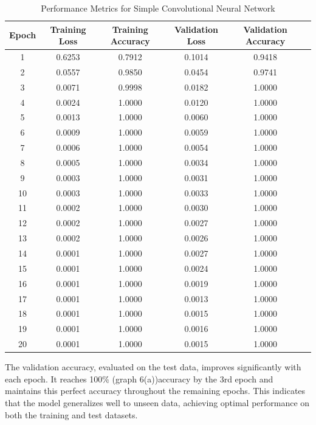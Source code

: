 \documentclass[a4paper,10 pt]{article}
\begin{document}
  \begin{table}[H]
    \centering
    \caption{Performance Metrics for Simple Convolutional Neural Network}
    \label{tab:cnn_performance}
    \begin{tabular}{@{}cccccc@{}}
      \toprule
      \textbf{Epoch} & \textbf{Training Loss} & \textbf{Training Accuracy} & \textbf{Validation Loss} & \textbf{Validation Accuracy} \\
      \midrule
      1 & 0.6253 & 0.7912 & 0.1014 & 0.9418 \\
      2 & 0.0557 & 0.9850 & 0.0454 & 0.9741 \\
      3 & 0.0071 & 0.9998 & 0.0182 & 1.0000 \\
      4 & 0.0024 & 1.0000 & 0.0120 & 1.0000 \\
      5 & 0.0013 & 1.0000 & 0.0060 & 1.0000 \\
      6 & 0.0009 & 1.0000 & 0.0059 & 1.0000 \\
      7 & 0.0006 & 1.0000 & 0.0054 & 1.0000 \\
      8 & 0.0005 & 1.0000 & 0.0034 & 1.0000 \\
      9 & 0.0003 & 1.0000 & 0.0031 & 1.0000 \\
      10 & 0.0003 & 1.0000 & 0.0033 & 1.0000 \\
      11 & 0.0002 & 1.0000 & 0.0030 & 1.0000 \\
      12 & 0.0002 & 1.0000 & 0.0027 & 1.0000 \\
      13 & 0.0002 & 1.0000 & 0.0026 & 1.0000 \\
      14 & 0.0001 & 1.0000 & 0.0027 & 1.0000 \\
      15 & 0.0001 & 1.0000 & 0.0024 & 1.0000 \\
      16 & 0.0001 & 1.0000 & 0.0019 & 1.0000 \\
      17 & 0.0001 & 1.0000 & 0.0013 & 1.0000 \\
      18 & 0.0001 & 1.0000 & 0.0015 & 1.0000 \\
      19 & 0.0001 & 1.0000 & 0.0016 & 1.0000 \\
      20 & 0.0001 & 1.0000 & 0.0015 & 1.0000 \\
      \bottomrule
  \end{tabular}
\end{table}


  The validation accuracy, evaluated on the test data, improves significantly with each epoch. It reaches 100\% (graph 6(a))accuracy by the 3rd epoch and maintains this perfect accuracy throughout the remaining epochs. This indicates that the model generalizes well to unseen data, achieving optimal performance on both the training and test datasets.
\end{document}
